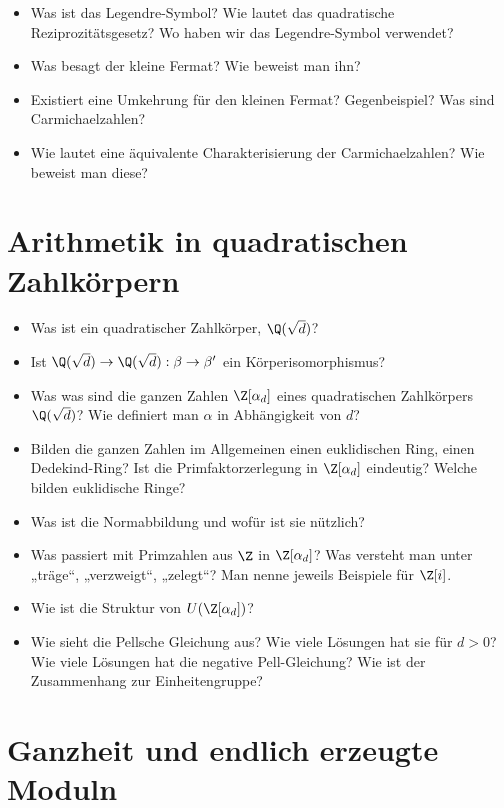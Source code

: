 \documentclass{scrartcl}
\begin{document}
\begin{itemize}
	\item
		Was ist das Legendre-Symbol?
		Wie lautet das quadratische Reziprozitätsgesetz?
		Wo haben wir das Legendre-Symbol verwendet?
	\item
		Was besagt der kleine Fermat?
		Wie beweist man ihn?
	\item
		Existiert eine Umkehrung für den kleinen Fermat?
		Gegenbeispiel?
		Was sind Carmichaelzahlen?
	\item
		Wie lautet eine äquivalente Charakterisierung der Carmichaelzahlen?
		Wie beweist man diese?
\end{itemize}

\section{Arithmetik in quadratischen Zahlkörpern}

\begin{itemize}
	\item
		Was ist ein quadratischer Zahlkörper, $\Q(\sqrt d)$?
	\item
		Ist $\Q(\sqrt d) \to \Q(\sqrt d) : \beta \to \beta'$ ein Körperisomorphismus?
	\item
		Was was sind die ganzen Zahlen $\Z[\alpha_d]$ eines quadratischen Zahlkörpers $\Q(\sqrt d)$?
		Wie definiert man $\alpha$ in Abhängigkeit von $d$?
	\item
		Bilden die ganzen Zahlen im Allgemeinen einen euklidischen Ring, einen Dedekind-Ring?
		Ist die Primfaktorzerlegung in $\Z[\alpha_d]$ eindeutig?
		Welche bilden euklidische Ringe?
	\item
		Was ist die Normabbildung und wofür ist sie nützlich?
	\item
		Was passiert mit Primzahlen aus $\Z$ in $\Z[\alpha_d]$?
		Was versteht man unter „träge“, „verzweigt“, „zelegt“?
		Man nenne jeweils Beispiele für $\Z[i]$.
	\item
		Wie ist die Struktur von $U(\Z[\alpha_d])$?
	\item
		Wie sieht die Pellsche Gleichung aus?
		Wie viele Lösungen hat sie für $d > 0$?
		Wie viele Lösungen hat die negative Pell-Gleichung?
		Wie ist der Zusammenhang zur Einheitengruppe?
\end{itemize}

\section{Ganzheit und endlich erzeugte Moduln}
\end{document}
